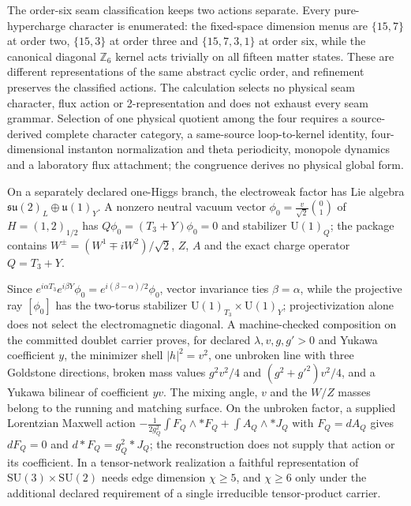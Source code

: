 \documentclass[11pt]{article}
\begin{document}
The order-six seam classification keeps two actions separate. Every
pure-hypercharge character is enumerated: the fixed-space dimension menus are
\(\{15,7\}\) at order two, \(\{15,3\}\) at order three and \(\{15,7,3,1\}\) at
order six, while the canonical diagonal \(\mathbb Z_6\) kernel acts trivially
on all fifteen matter states. These are different representations of the
same abstract cyclic order, and refinement preserves the classified actions.
The calculation selects no physical seam character, flux action or
2-representation and does not exhaust every seam grammar. Selection of one
physical quotient among the four requires a source-derived complete character
category, a same-source loop-to-kernel identity, four-dimensional instanton
normalization and theta periodicity, monopole dynamics and a laboratory flux
attachment; the congruence derives no physical global form.

\begin{corollary}
On a separately declared one-Higgs branch, the electroweak factor has Lie
algebra \(\mathfrak{su}(2)_L\oplus\mathfrak u(1)_Y\). A nonzero neutral vacuum
vector \(\phi_0=\frac{v}{\sqrt2}\binom01\) of \(H=(1,2)_{1/2}\) has
\(Q\phi_0=(T_3+Y)\phi_0=0\) and stabilizer \(\mathrm U(1)_Q\); the package
contains \(W^\pm=(W^1\mp iW^2)/\sqrt2\), \(Z\), \(A\) and the exact charge
operator \(Q=T_3+Y\).
\end{corollary}

Since \(e^{i\alpha T_3}e^{i\beta Y}\phi_0=e^{i(\beta-\alpha)/2}\phi_0\), vector
invariance ties \(\beta=\alpha\), while the projective ray \([\phi_0]\) has the
two-torus stabilizer \(\mathrm U(1)_{T_3}\times\mathrm U(1)_Y\); projectivization
alone does not select the electromagnetic diagonal. A machine-checked
composition on the committed doublet carrier proves, for declared
\(\lambda,v,g,g'>0\) and Yukawa coefficient \(y\), the minimizer shell
\(|h|^2=v^2\), one unbroken line with three Goldstone directions, broken
mass values \(g^2v^2/4\) and \((g^2+g'^2)v^2/4\), and a Yukawa bilinear of
coefficient \(yv\). The mixing angle, \(v\) and the \(W/Z\) masses belong to
the running and matching surface. On the unbroken factor, a supplied
Lorentzian Maxwell action
\(-\frac{1}{2g_Q^2}\int F_Q\wedge*F_Q+\int A_Q\wedge*J_Q\) with
\(F_Q=dA_Q\) gives \(dF_Q=0\) and \(d*F_Q=g_Q^2*J_Q\); the reconstruction does
not supply that action or its coefficient. In a tensor-network realization a
faithful representation of \(\mathrm{SU}(3)\times\mathrm{SU}(2)\) needs edge
dimension \(\chi\ge5\), and \(\chi\ge6\) only under the additional declared
requirement of a single irreducible tensor-product carrier.
\end{document}
